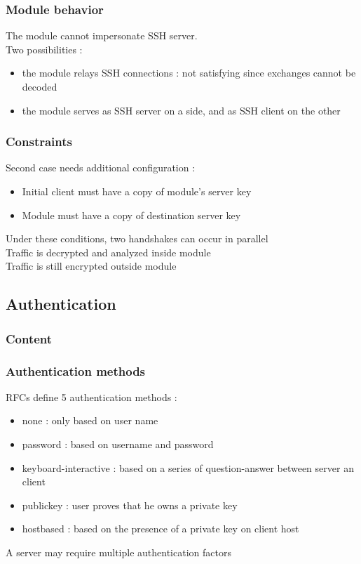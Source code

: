 \documentclass{beamer}
\begin{document}
\begin{frame}
\frametitle{Module behavior}

The module cannot impersonate SSH server.\\
Two possibilities :
\begin{itemize}
\item the module relays SSH connections : not satisfying since exchanges cannot be decoded
\item the module serves as SSH server on a side, and as SSH client on the other
\end{itemize}


\end{frame}



\begin{frame}
\frametitle{Constraints}
Second case needs additional configuration :

\begin{itemize}
\item Initial client must have a copy of module's server key
\item Module must have a copy of destination server key
\end{itemize}

Under these conditions, two handshakes can occur in parallel\\
Traffic is decrypted and analyzed inside module\\
Traffic is still encrypted outside module
\end{frame}





\subsection{Authentication}

\begin{frame}
\frametitle{Content}
\tableofcontents[currentsubsection]
\end{frame}


\begin{frame}
\frametitle{Authentication methods}
RFCs define 5 authentication methods :
\begin{itemize}
\item none : only based on user name
\item password : based on username and password
\item keyboard-interactive : based on a series of question-answer between server an client
\item publickey : user proves that he owns a private key
\item hostbased : based on the presence of a private key on client host
\end{itemize}

A server may require multiple authentication factors

\end{frame}
\end{document}
